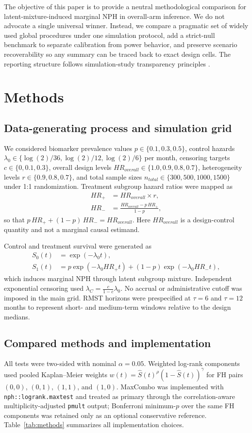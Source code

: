 \documentclass[11pt]{article}
\begin{document}
The objective of this paper is to provide a neutral methodological comparison for latent-mixture-induced marginal NPH in overall-arm inference. We do not advocate a single universal winner. Instead, we compare a pragmatic set of widely used global procedures under one simulation protocol, add a strict-null benchmark to separate calibration from power behavior, and preserve scenario recoverability so any summary can be traced back to exact design cells. The reporting structure follows simulation-study transparency principles \citep{morris2019}.

\section{Methods}
\subsection{Data-generating process and simulation grid}
We considered biomarker prevalence values $p\in\{0.1,0.3,0.5\}$, control hazards $\lambda_0\in\{\log(2)/36,\log(2)/12,\log(2)/6\}$ per month, censoring targets $c\in\{0,0.1,0.3\}$, overall design levels $HR_{overall}\in\{1.0,0.9,0.8,0.7\}$, heterogeneity levels $r\in\{0.9,0.8,0.7\}$, and total sample sizes $n_{total}\in\{300,500,1000,1500\}$ under 1:1 randomization. Treatment subgroup hazard ratios were mapped as
\begin{align}
HR_+ &= HR_{overall}\times r, \\
HR_- &= \frac{HR_{overall}-p\,HR_+}{1-p},
\end{align}
so that $p\,HR_+ + (1-p)\,HR_- = HR_{overall}$. Here $HR_{overall}$ is a design-control quantity and not a marginal causal estimand.

Control and treatment survival were generated as
\begin{align}
S_0(t)&=\exp(-\lambda_0 t), \\
S_1(t)&=p\exp(-\lambda_0 HR_+ t)+(1-p)\exp(-\lambda_0 HR_- t),
\end{align}
which induces marginal NPH through latent subgroup mixture. Independent exponential censoring used $\lambda_C = \frac{c}{1-c}\lambda_0$. No accrual or administrative cutoff was imposed in the main grid. RMST horizons were prespecified at $\tau=6$ and $\tau=12$ months to represent short- and medium-term windows relative to the design medians.

\subsection{Compared methods and implementation}
All tests were two-sided with nominal $\alpha=0.05$. Weighted log-rank components used pooled Kaplan--Meier weights $w(t)=\hat S(t)^\rho(1-\hat S(t))^\gamma$ for FH pairs $(0,0)$, $(0,1)$, $(1,1)$, and $(1,0)$. MaxCombo was implemented with \texttt{nph::logrank.maxtest} and treated as primary through the correlation-aware multiplicity-adjusted \texttt{pmult} output; Bonferroni minimum-\(p\) over the same FH components was retained only as an optional conservative reference. Table~\ref{tab:methods} summarizes all implementation choices.
\end{document}
